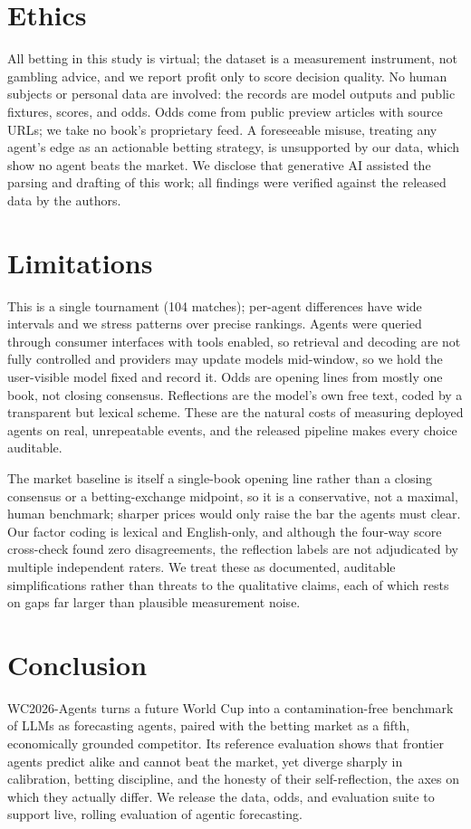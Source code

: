 \documentclass[sigconf,review]{acmart}
\begin{document}
\section{Ethics}
All betting in this study is virtual; the dataset is a measurement instrument,
not gambling advice, and we report profit only to score decision quality. No
human subjects or personal data are involved: the records are model outputs and
public fixtures, scores, and odds. Odds come from public preview articles with
source URLs; we take no book's proprietary feed. A foreseeable misuse,
treating any agent's edge as an actionable betting strategy, is unsupported
by our data, which show no agent beats the market. We disclose that generative
AI assisted the parsing and drafting of this work; all findings were verified
against the released data by the authors.

\section{Limitations}
This is a single tournament (104 matches); per-agent differences have wide
intervals and we stress patterns over precise rankings. Agents were queried
through consumer interfaces with tools enabled, so retrieval and decoding are not
fully controlled and providers may update models mid-window, so we hold the
user-visible model fixed and record it. Odds are opening lines from mostly one
book, not closing consensus. Reflections are the model's own free text, coded by
a transparent but lexical scheme. These are the natural costs of measuring
deployed agents on real, unrepeatable events, and the released pipeline makes
every choice auditable.

The market baseline is itself a single-book opening line rather than a closing
consensus or a betting-exchange midpoint, so it is a conservative, not a maximal,
human benchmark; sharper prices would only raise the bar the agents must clear.
Our factor coding is lexical and English-only, and although the four-way score
cross-check found zero disagreements, the reflection labels are not adjudicated
by multiple independent raters. We treat these as documented, auditable
simplifications rather than threats to the qualitative claims, each of which
rests on gaps far larger than plausible measurement noise.

\section{Conclusion}
WC2026-Agents turns a future World Cup into a contamination-free benchmark of
LLMs as forecasting agents, paired with the betting market as a fifth,
economically grounded competitor. Its reference evaluation shows that frontier
agents predict alike and cannot beat the market, yet diverge sharply in
calibration, betting discipline, and the honesty of their self-reflection, the
axes on which they actually differ. We release the data, odds, and evaluation
suite to support live, rolling evaluation of agentic forecasting.
\end{document}
